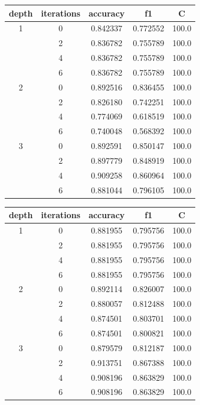\documentclass[12pt]{scrartcl}
\begin{document}
\begin{center}
\begin{tabular}{ccccc}
\toprule
 depth & iterations &  accuracy &        f1 &      C \\
\midrule
1 & 0 &  0.842337 &  0.772552 &  100.0 \\
  & 2 &  0.836782 &  0.755789 &  100.0 \\
  & 4 &  0.836782 &  0.755789 &  100.0 \\
  & 6 &  0.836782 &  0.755789 &  100.0 \\
\hline
2 & 0 &  0.892516 &  0.836455 &  100.0 \\
  & 2 &  0.826180 &  0.742251 &  100.0 \\
  & 4 &  0.774069 &  0.618519 &  100.0 \\
  & 6 &  0.740048 &  0.568392 &  100.0 \\
\hline
3 & 0 &  0.892591 &  0.850147 &  100.0 \\
  & 2 &  0.897779 &  0.848919 &  100.0 \\
  & 4 &  0.909258 &  0.860964 &  100.0 \\
  & 6 &  0.881044 &  0.796105 &  100.0 \\
\bottomrule
\end{tabular}
\end{center}

\begin{center}
\begin{tabular}{ccccc}
\toprule
depth & iterations & accuracy & f1 & C \\
\midrule
1 & 0 &  0.881955 &  0.795756 &  100.0 \\
  & 2 &  0.881955 &  0.795756 &  100.0 \\
  & 4 &  0.881955 &  0.795756 &  100.0 \\
  & 6 &  0.881955 &  0.795756 &  100.0 \\
\hline
2 & 0 &  0.892114 &  0.826007 &  100.0 \\
  & 2 &  0.880057 &  0.812488 &  100.0 \\
  & 4 &  0.874501 &  0.803701 &  100.0 \\
  & 6 &  0.874501 &  0.800821 &  100.0 \\
\hline
3 & 0 &  0.879579 &  0.812187 &  100.0 \\
  & 2 &  0.913751 &  0.867388 &  100.0 \\
  & 4 &  0.908196 &  0.863829 &  100.0 \\
  & 6 &  0.908196 &  0.863829 &  100.0 \\
\bottomrule
\end{tabular}
\end{center}
\end{document}
